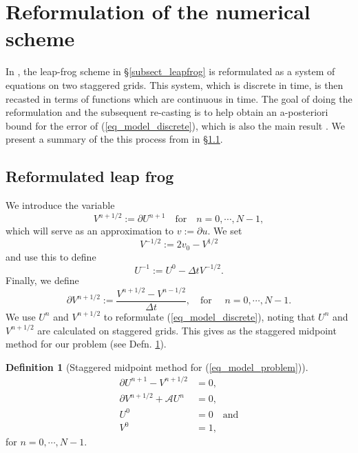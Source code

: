 \documentclass[12pt,a4paper]{article}
\numberwithin{equation}{section}
\theoremstyle{definition}
\newtheorem{Defn}[subsection]{Definition}
\begin{document}
\section{Reformulation of the numerical scheme}\label{sec_reformulation}
In \cite{georgoulis2016posteriori}, the  leap-frog scheme in \S \ref{subsect_leapfrog} is reformulated as a system of equations on two staggered grids.  This system, which is discrete in time, is then recasted in terms of functions which are continuous in time.  The goal of doing the reformulation and the subsequent re-casting is to help obtain  an a-posteriori bound for the error of (\ref{eq_model_discrete}), which is also the main result \cite{georgoulis2016posteriori}.  We present a summary of the this process from \cite{georgoulis2016posteriori} in  \S \ref{subsec_reform_leapfrog}.
\subsection{Reformulated leap frog}\label{subsec_reform_leapfrog}
We introduce the variable
\begin{equation}
V^{n+1/2}:=\partial U^{n+1} \quad\text{for} \quad n=0,\cdots,N-1,
\end{equation}
which will serve as an approximation to $v:= \partial u$. We set 
\begin{equation}
V^{-1/2}:=2v_0-V^{1/2}
\end{equation}
and  use this to define
\begin{equation}
U^{-1} := U^0-\Delta t V^{-1/2}.
\end{equation}
Finally, we define
\begin{equation}
\partial V^{n+1/2}:= \frac{V^{n+1/2}-V^{n-1/2}}{\Delta t}, \quad \text{for } \quad n= 0,\cdots, N-1.
\end{equation}
We use $U^n$ and $V^{n+1/2}$ to reformulate (\ref{eq_model_discrete}), noting that $U^n$ and $V^{n+1/2}$ are calculated on staggered grids. This gives as the staggered midpoint method for our problem (see Defn. \ref{defn_staggered_midpoint}).
\begin{Defn}[Staggered midpoint method for (\ref{eq_model_problem})]\label{defn_staggered_midpoint}
\begin{equation}\label{eq_harmonic_discretization}
\begin{aligned}
\partial U^{n+1} - V^{n+1/2} &= 0,\\
\partial V^{n+1/2} +\mathcal{A}U^n &= 0,\\
U^0 & =0\quad \text{and}\\
V^0 &=1,
\end{aligned}
\end{equation}
for $n= 0,\cdots, N-1$.
\end{Defn}
\end{document}

